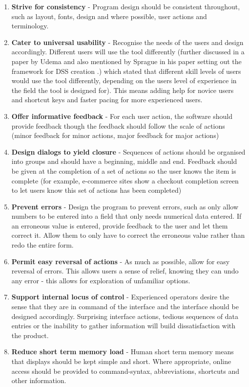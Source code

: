 \documentclass[table,a4paper,oneside]{book}
\begin{document}
\begin{enumerate}
\item \textbf{Strive for consistency} - Program design should be consistent throughout, such as layout, fonts, design and where possible, user actions and terminology.

\item \textbf{Cater to universal usability} - Recognise the needs of the users and design accordingly. Different users will use the tool differently (further discussed in a paper by Udema \citep{Uduma2007} and also mentioned by Sprague in his paper setting out the framework for \ac{DSS} creation \citep{Sprague1980}.) which stated that different skill levels of users would use the tool differently, depending on the users level of experience in the field the tool is designed for). This means adding help for novice users and shortcut keys and faster pacing for more experienced users.

\item \textbf{Offer informative feedback} - For each user action, the software should provide feedback though the feedback should follow the scale of actions (minor feedback for minor actions, major feedback for major actions)

\item \textbf{Design dialogs to yield closure} - Sequences of actions should be organised into groups and should have a beginning, middle and end. Feedback should be given at the completion of a set of actions so the user knows the item is complete (for example, e-commerce sites show a checkout completion screen to let users know this set of actions has been completed)

\item \textbf{Prevent errors} - Design the program to prevent errors, such as only allow numbers to be entered into a field that only needs numerical data entered. If an erroneous value is entered, provide feedback to the user and let them correct it. Allow them to only have to correct the erroneous value rather than redo the entire form.

\item \textbf{Permit easy reversal of actions} - As much as possible, allow for easy reversal of errors. This allows users a sense of relief, knowing they can undo any error - this allows for exploration of unfamiliar options.

\item \textbf{Support internal locus of control} - Experienced operators desire the sense that they are in command of the interface and the interface should be designed accordingly. Surprising interface actions, tedious sequences of data entries or the inability to gather information will build dissatisfaction with the product.

\item \textbf{Reduce short term memory load} - Human short term memory means that displays should be kept simple and short. Where appropriate, online access should be provided to command-syntax, abbreviations, shortcuts and other information.
\end{enumerate}
\end{document}
